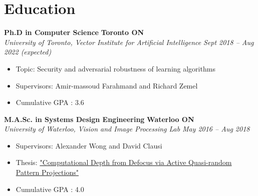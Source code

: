 \section*{Education}
\vspace{\postsubhead}
    \textbf{Ph.D in Computer Science}
    \hfill
    \textbf{Toronto ON}\\
    \textit{University of Toronto, Vector Institute for Artificial Intelligence}
    \hfill
    \textit{Sept 2018 -- Aug 2022 (expected)}
    \begin{itemize}
        \item Topic: Security and adversarial robustness of learning algorithms
        \item Supervisors: Amir-massoud Farahmand and Richard Zemel
        \item Cumulative GPA : 3.6
    \end{itemize}
    \vspace{\interlist}
    
    \textbf{M.A.Sc. in Systems Design Engineering}
    \hfill
    \textbf{Waterloo ON}\\
    \textit{University of Waterloo, Vision and Image Processing Lab}
    \hfill
    \textit{May 2016 -- Aug 2018}
    \begin{itemize}
        \item Supervisors: Alexander Wong and David Clausi
        \item Thesis: \href{https://uwspace.uwaterloo.ca/handle/10012/13645}{"Computational Depth from Defocus via Active Quasi-random Pattern Projections"}
        \item Cumulative GPA : 4.0
    \end{itemize}
    \vspace{\interlist}

